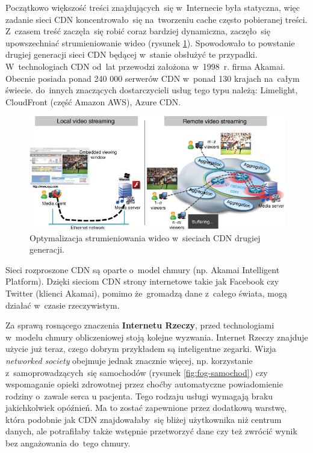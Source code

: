 \documentclass[12pt,a4paper,twoside,titlepage,openright]{book}
\begin{document}
Początkowo większość treści znajdujących~się w~Internecie była statyczna, więc zadanie sieci CDN koncentrowało~się na~tworzeniu cache często pobieranej treści. Z~czasem treść zaczęła~się robić coraz bardziej dynamiczna, zaczęło~się upowszechniać strumieniowanie wideo (rysunek \ref{fig:cdn-streaming}). Spowodowało to powstanie drugiej generacji sieci CDN będącej w~stanie obsłużyć te przypadki. W~technologiach CDN od~lat przewodzi założona w~1998~r. firma Akamai. Obecnie posiada ponad 240 000 serwerów CDN w~ponad 130 krajach na~całym świecie.\cite{siteAkamaiFacts} do~innych znaczących dostarczycieli usług tego typu należą: Limelight, CloudFront (część Amazon AWS), Azure CDN. \cite{ccCambridge, cdn}

\begin{figure}[h]
	\centering
			\includegraphics[resolution=120]{cdn-streaming.jpg}
		\caption{Optymalizacja strumieniowania wideo w~sieciach CDN drugiej generacji. \cite{cdn}}
		\label{fig:cdn-streaming}
\end{figure}


Sieci rozproszone CDN są oparte o~model chmury (np. Akamai Intelligent Platform). Dzięki sieciom CDN strony internetowe takie jak Facebook czy Twitter (klienci Akamai), pomimo że~gromadzą dane z~całego świata, mogą działać w~czasie rzeczywistym. \cite{ccCambridge}

Za sprawą rosnącego znaczenia \textbf{Internetu Rzeczy}, przed technologiami w~modelu chmury obliczeniowej stoją kolejne wyzwania. Internet Rzeczy znajduje użycie już teraz, czego dobrym przykładem są inteligentne zegarki. Wizja \textit{networked society} obejmuje jednak znacznie więcej, np. korzystanie z~samoprowadzących~się samochodów (rysunek \ref{fig:fog-samochod}) czy wspomaganie opieki zdrowotnej przez choćby automatyczne powiadomienie rodziny o~zawale serca u pacjenta. Tego rodzaju usługi wymagają braku jakichkolwiek opóźnień. Ma to zostać zapewnione przez dodatkową warstwę, która podobnie jak CDN znajdowałaby~się bliżej użytkownika niż centrum danych, ale potrafiłaby także wstępnie przetworzyć dane czy też zwrócić wynik bez angażowania do~tego chmury.
\end{document}
